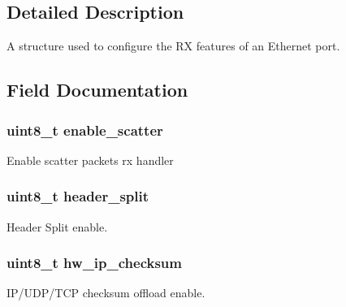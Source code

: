 \subsection{Detailed Description}
A structure used to configure the R\+X features of an Ethernet port. 

\subsection{Field Documentation}
\hypertarget{structrte__eth__rxmode_a35db2420233aa9f3f454a35d0a4f7f18}{}
\subsubsection[{enable\+\_\+scatter}]{\setlength{\rightskip}{0pt plus 5cm}uint8\+\_\+t enable\+\_\+scatter}\label{structrte__eth__rxmode_a35db2420233aa9f3f454a35d0a4f7f18}
Enable scatter packets rx handler \hypertarget{structrte__eth__rxmode_a151c3d1338430053f25c0ac18dae10fb}{}
\subsubsection[{header\+\_\+split}]{\setlength{\rightskip}{0pt plus 5cm}uint8\+\_\+t header\+\_\+split}\label{structrte__eth__rxmode_a151c3d1338430053f25c0ac18dae10fb}
Header Split enable. \hypertarget{structrte__eth__rxmode_a73042c1ac081c9f555cdc1a476485513}{}
\subsubsection[{hw\+\_\+ip\+\_\+checksum}]{\setlength{\rightskip}{0pt plus 5cm}uint8\+\_\+t hw\+\_\+ip\+\_\+checksum}\label{structrte__eth__rxmode_a73042c1ac081c9f555cdc1a476485513}
I\+P/\+U\+D\+P/\+T\+C\+P checksum offload enable. \hypertarget{structrte__eth__rxmode_aea339586279530eadadaf36722346d93}{}
